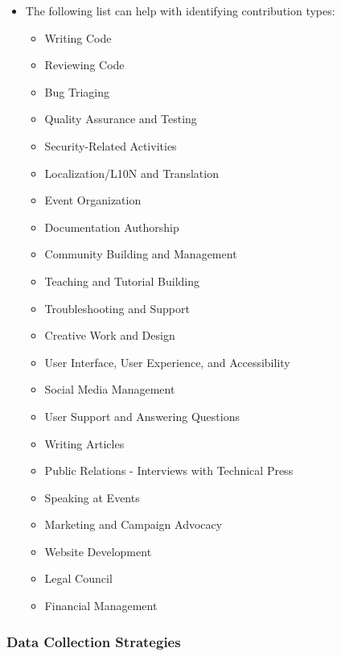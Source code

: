 \documentclass[
  12pt,
]{article}
\providecommand{\tightlist}{%
  \setlength{\itemsep}{0pt}\setlength{\parskip}{0pt}}
\begin{document}
\begin{itemize}
\tightlist
\item
  The following list can help with identifying contribution types:

  \begin{itemize}
  \tightlist
  \item
    Writing Code
  \item
    Reviewing Code
  \item
    Bug Triaging
  \item
    Quality Assurance and Testing
  \item
    Security-Related Activities
  \item
    Localization/L10N and Translation
  \item
    Event Organization
  \item
    Documentation Authorship
  \item
    Community Building and Management
  \item
    Teaching and Tutorial Building
  \item
    Troubleshooting and Support
  \item
    Creative Work and Design
  \item
    User Interface, User Experience, and Accessibility
  \item
    Social Media Management
  \item
    User Support and Answering Questions
  \item
    Writing Articles
  \item
    Public Relations - Interviews with Technical Press
  \item
    Speaking at Events
  \item
    Marketing and Campaign Advocacy
  \item
    Website Development
  \item
    Legal Council
  \item
    Financial Management
  \end{itemize}
\end{itemize}

\hypertarget{data-collection-strategies-1}{%
\subsubsection{Data Collection
Strategies}\label{data-collection-strategies-1}}
\end{document}
